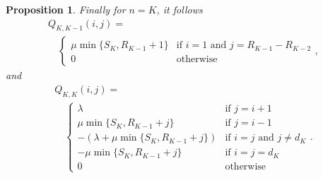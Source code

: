 \documentclass[conference]{IEEEtran}
\newtheorem{prosi}{Proposition}
\begin{document}
\begin{prosi}
% 

Finally for $n=K$, it follows
\begin{multline*}
Q_{K,K \!-\!1}(i,j) = \\
\quad 
\begin{cases}
\mu \min\{S_{K},R_{K \!-\!1} \!+\!1\}   & \! \mbox{if} \, \, i\!=\!1 \, \, \mbox{and} \, \,  j\!=\!R_{K \!-\!1}\!-\!R_{K\!-\!2}\\
0                                       & \! \mbox{otherwise}
\end{cases} ,
\end{multline*}
and 
\begin{multline*}
Q_{K,K}(i,j) = \\ 
\quad 
\begin{cases}
\lambda                                     & \mbox{if } j=i+1\\
\mu \min\{S_{K},R_{K\!-\!1}+j\}             & \mbox{if } j=i-1\\
-(\lambda+ \mu \min\{S_{K},R_{K-1}\!+\!j\}) & \mbox{if } i=j \mbox{ and } j \neq \! d_{K}\\
- \mu \min\{S_{K},R_{K-1}+j\}               & \mbox{if } i=j=\! d_{K}\\
0                                           & \mbox{otherwise} 
\end{cases}.
\end{multline*}
       

\end{prosi}
\end{document}
